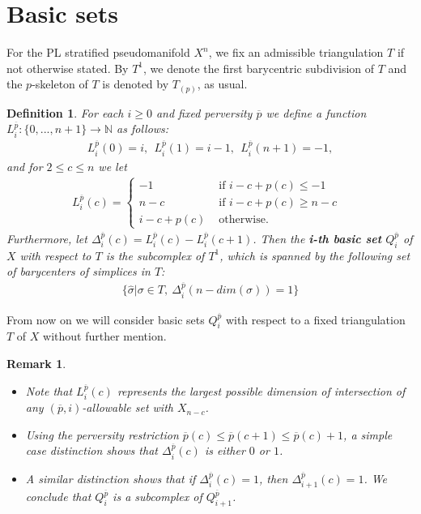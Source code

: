 \documentclass{scrreprt}
\newtheorem{definition}[prop]{Definition}
\newtheorem{remark}[prop]{Remark}
\begin{document}
\section{Basic sets}

For the PL stratified pseudomanifold $X^n$, we fix an admissible triangulation $T$ if not otherwise stated. By $T^1$, we denote the first barycentric subdivision of $T$ and the $p$-skeleton of $T$ is denoted by $T_{(p)}$, as usual.

\begin{definition}
For each $i \geq 0$ and fixed perversity $\overline{p}$ we define a function $L_i^{\overline{p}}: \{ 0,...,n+1 \} \to \mathbb{N}$ as follows: 
\begin{align*}
L_i^{\overline{p}}(0)=i,\ \ L_i^{\overline{p}}(1)=i-1,\ \ L_i^{\overline{p}}(n+1)=-1,
\end{align*}
and for $2 \leq c \leq n$ we let
\begin{align*}
L_i^{\overline{p}}(c)=
\begin{cases}
-1 &\text{ if $i-c+p(c) \leq -1$}  \\
n-c &\text{ if $i-c+p(c) \geq n-c$ } \\
i-c+p(c) &\text{ otherwise.}
\end{cases}
\end{align*}
Furthermore, let $\Delta_i^{\overline{p}}(c)=L_i^{\overline{p}}(c) - L_i^{\overline{p}}(c+1)$. Then the \textbf{i-th basic set} $Q_i^{\overline{p}}$ of $X$ with respect to $T$ is the subcomplex of $T^1$, which is spanned by the following set of barycenters of simplices in $T$:
\begin{align*}
\{ \hat{\sigma} | \sigma \in T,\ \Delta_i^{\overline{p}}(n-dim(\sigma))=1\}
\end{align*}
\end{definition}

From now on we will consider basic sets $Q_i^{\overline{p}}$ with respect to a fixed triangulation $T$ of $X$ without further mention.

\begin{remark}\label{remarkbasic}
\begin{itemize}
\item[1.] Note that $L_i^{\overline{p}}(c)$ represents the largest possible dimension of intersection of any $(\overline{p},i)$-allowable set with $X_{n-c}$.
\item[2.] Using the perversity restriction $\overline{p}(c) \leq \overline{p}(c+1) \leq \overline{p}(c)+1$, a simple case distinction shows that $\Delta_i^{\overline{p}}(c)$ is either $0$ or $1$.
\item[3.] A similar distinction shows that if $\Delta_i^{\overline{p}}(c)=1$, then $\Delta_{i+1}^{\overline{p}}(c)=1$. We conclude that $Q_i^{\overline{p}}$ is a subcomplex of $Q_{i+1}^{\overline{p}}$.
\end{itemize}
\end{remark}
\end{document}
